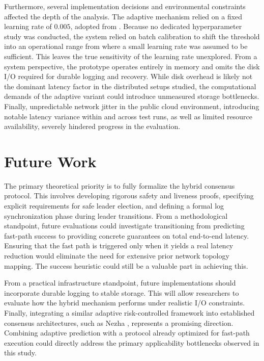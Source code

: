 Furthermore, several implementation decisions and environmental constraints affected the depth of the analysis. The adaptive mechanism relied on a fixed learning rate of $0.005$, adopted from \cite{Angelopoulus-NeuralInformationProcessing-2023}. Because no dedicated hyperparameter study was conducted, the system relied on batch calibration to shift the threshold into an operational range from where a small learning rate was assumed to be sufficient. This leaves the true sensitivity of the learning rate unexplored. From a system perspective, the prototype operates entirely in memory and omits the disk I/O required for durable logging and recovery. While disk overhead is likely not the dominant latency factor in the distributed setups studied, the computational demands of the adaptive variant could introduce unmeasured storage bottlenecks. Finally, unpredictable network jitter in the public cloud environment, introducing notable latency variance within and across test runs, as well as limited resource availability, severely hindered progress in the evaluation.

\section{Future Work}
\label{sec:future_work}

The primary theoretical priority is to fully formalize the hybrid consensus protocol. This involves developing rigorous safety and liveness proofs, specifying explicit requirements for safe leader election, and defining a formal log synchronization phase during leader transitions. From a methodological standpoint, future evaluations could investigate  transitioning from predicting fast-path success to providing concrete guarantees on total end-to-end latency. Ensuring that the fast path is triggered only when it yields a real latency reduction would eliminate the need for extensive prior network topology mapping. The success heuristic could still be a valuable part in achieving this.

From a practical infrastructure standpoint, future implementations should incorporate durable logging to stable storage. This will allow researchers to evaluate how the hybrid mechanism performs under realistic I/O constraints. Finally, integrating a similar adaptive risk-controlled framework into established consensus architectures, such as Nezha \cite{Geng-NezhaConsensus-2022}, represents a promising direction. Combining adaptive prediction with a protocol already optimized for fast-path execution could directly address the primary applicability bottlenecks observed in this study.